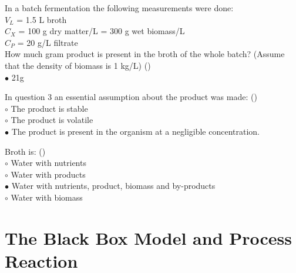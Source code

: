 \documentclass[]{beamer}
\begin{document}
\begin{frame}[shrink] {}
\addtocounter{questions}{1}
\color{blue}
In a batch fermentation the following measurements were done: \\
\color{gray}
$V_L$ = 1.5 L broth  \\
$C_X$ = 100 g dry matter/L = 300 g wet biomass/L \\
$C_P$ = 20 g/L filtrate \\
\color{blue}
How much gram product is present in the broth of the whole batch? 
(Assume that the density of biomass is 1 kg/L) ()\\
\color{black}
{\color{red}$\bullet$} 21g \\
\end{frame}

\begin{frame}[shrink] {}
\addtocounter{questions}{1}
\color{blue}
In question 3 an essential assumption about the product was made: ()\\
\color{black}
\setlength{\parindent}{-0.4cm}
{\color{red}$\circ$}  The product is stable \\
{\color{red}$\circ$} The product is volatile \\
{\color{red}$\bullet$} The product is present in the organism at a negligible concentration.  \\
\end{frame}

\begin{frame}[shrink] {}
\addtocounter{questions}{1}
\color{blue}
Broth is: ()\\
\color{black}
\setlength{\parindent}{-0.4cm}
{\color{red}$\circ$}  Water with nutrients \\
{\color{red}$\circ$} Water with products \\
{\color{red}$\bullet$}  Water with nutrients, product, biomass and by-products \\
{\color{red}$\circ$} Water with biomass  \\
\end{frame}
\section{The Black Box Model and Process Reaction}
\end{document}

